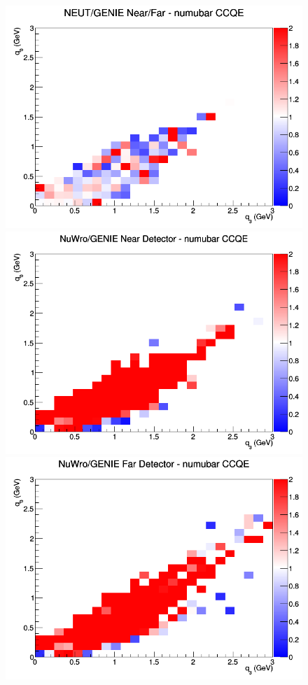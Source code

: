 \documentclass[12pt]{article}
\begin{document}
\begin{figure}[h]
\endminipage
{}
\includegraphics[width=\linewidth]{eff_q0_q3/LAr/ratios/CCQE_NEUT_GENIE_numubar_NF_q3_q0.png}
\endminipage
\newline
{}
\includegraphics[width=\linewidth]{eff_q0_q3/LAr/ratios/CCQE_NuWro_GENIE_numubar_near_q3_q0.png}
\endminipage
{}
\includegraphics[width=\linewidth]{eff_q0_q3/LAr/ratios/CCQE_NuWro_GENIE_numubar_far_q3_q0.png}

\end{figure}
\end{document}
